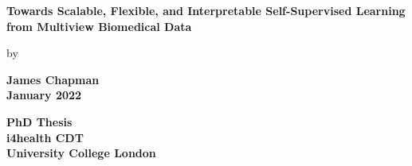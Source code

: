 \documentclass{report}
\author{James Chapman}
\numberwithin{figure}{chapter}
\numberwithin{table}{section}
\begin{document}
\begin{titlepage}
    \begin{center}
        {\LARGE\textbf{Towards Scalable, Flexible, and Interpretable Self-Supervised Learning from Multiview Biomedical Data}
            \author{James Chapman\\
                \\}}

        \vspace{0.8cm}
        by\\
        \vspace{0.8cm}

        {\LARGE\textbf{James Chapman\\}}
        \vspace{1.5cm}
        {\LARGE\textbf{January 2022}}

        \vfill

        \textbf{
            PhD Thesis\\
            \vspace{1cm}
            i4health CDT\\
            University College London\\}

        \vspace{2cm}
    \end{center}
\end{titlepage}

\onehalfspacing

\newpage



\end{document}
